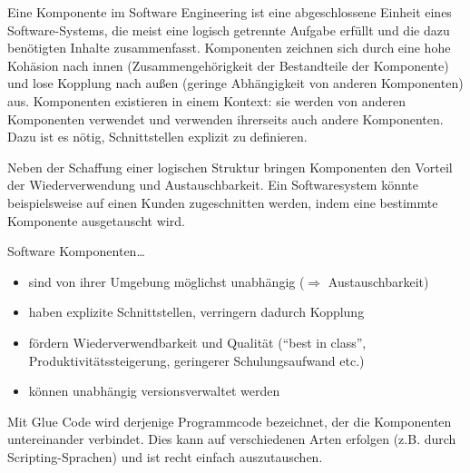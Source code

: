 Eine Komponente im Software Engineering ist eine abgeschlossene Einheit eines Software-Systems, die
meist eine logisch getrennte Aufgabe erfüllt und die dazu benötigten Inhalte zusammenfasst. Komponenten
zeichnen sich durch eine hohe Kohäsion nach innen (Zusammengehörigkeit der Bestandteile der Komponente) und lose Kopplung nach außen (geringe Abhängigkeit von anderen Komponenten) aus. Komponenten
existieren in einem Kontext: sie werden von anderen Komponenten verwendet und verwenden ihrerseits
auch andere Komponenten. Dazu ist es nötig, Schnittstellen explizit zu definieren.\par
Neben der Schaffung einer logischen Struktur bringen Komponenten den Vorteil der Wiederverwendung
und Austauschbarkeit. Ein Softwaresystem könnte beispielsweise auf einen Kunden zugeschnitten werden,
indem eine bestimmte Komponente ausgetauscht wird.

Software Komponenten\dots
\begin{itemize}
\item sind von ihrer Umgebung möglichst unabhängig ($\Rightarrow$ Austauschbarkeit)
\item haben explizite Schnittstellen, verringern dadurch Kopplung
\item fördern Wiederverwendbarkeit und Qualität (``best in class'', Produktivitätssteigerung, geringerer Schulungsaufwand etc.)
\item können unabhängig versionsverwaltet werden
\end{itemize}

Mit Glue Code wird derjenige Programmcode bezeichnet, der die Komponenten untereinander verbindet.
Dies kann auf verschiedenen Arten erfolgen (z.B. durch Scripting-Sprachen) und ist recht einfach auszutauschen.